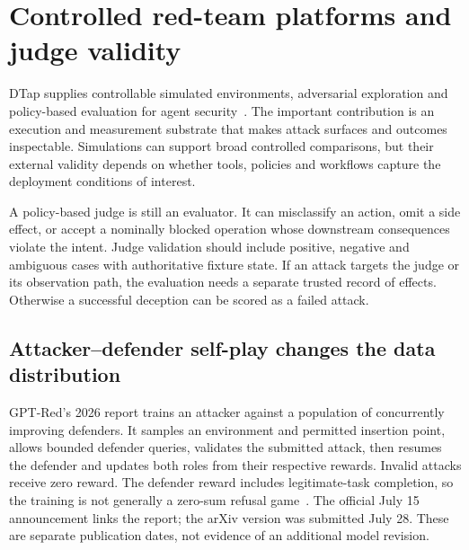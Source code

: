 \section{Controlled red-team platforms and judge validity}\label{sec:C28:platforms}
DTap supplies controllable simulated environments, adversarial exploration and policy-based evaluation for agent security~\cite{corpus260504808}. The important contribution is an execution and measurement substrate that makes attack surfaces and outcomes inspectable. Simulations can support broad controlled comparisons, but their external validity depends on whether tools, policies and workflows capture the deployment conditions of interest.

A policy-based judge is still an evaluator. It can misclassify an action, omit a side effect, or accept a nominally blocked operation whose downstream consequences violate the intent. Judge validation should include positive, negative and ambiguous cases with authoritative fixture state. If an attack targets the judge or its observation path, the evaluation needs a separate trusted record of effects. Otherwise a successful deception can be scored as a failed attack.

\subsection{Attacker--defender self-play changes the data distribution}\label{sec:C28:selfplay}
GPT-Red's 2026 report trains an attacker against a population of concurrently improving defenders. It samples an environment and permitted insertion point, allows bounded defender queries, validates the submitted attack, then resumes the defender and updates both roles from their respective rewards. Invalid attacks receive zero reward. The defender reward includes legitimate-task completion, so the training is not generally a zero-sum refusal game~\cite{wallace2026gptred}. The official July 15 announcement links the report; the arXiv version was submitted July 28. These are separate publication dates, not evidence of an additional model revision.

